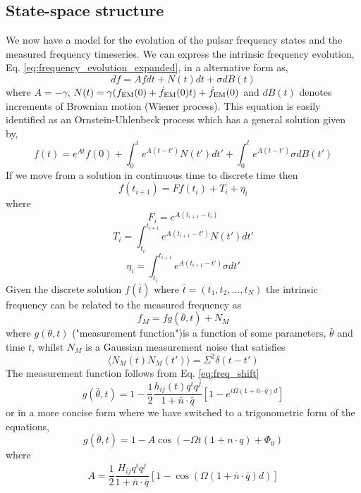 \documentclass[fleqn,usenatbib,useAMS]{mnras}
\begin{document}
\subsection{State-space structure} \label{sec3}
We now have a model for the evolution of the pulsar frequency states and the measured frequency timeseries. We can express the intrinsic frequency evolution, Eq. \ref{eq:frequency_evolution_expanded}, in a alternative form as,
\begin{equation}
	df = A f dt + N(t) dt + \sigma dB(t)
	\label{eq:state1}
\end{equation}
where $A = -\gamma$, $N(t) = \gamma(f_{\rm EM}(0) + \dot{f}_{\rm EM}(0) t) +\dot{f}_{\rm EM}(0)$ and $dB(t)$ denotes increments of Brownian motion (Wiener process). This equation is easily identified as an Ornstein-Uhlenbeck process which has a general solution given by,
\begin{equation}
	f(t) = e^{At}f(0) + \int_0^t e^{A(t-t')} N(t') dt' + \int_0^t e^{A(t-t')} \sigma dB(t')
\end{equation} 
If we move from a solution in continuous time to discrete time then
\begin{equation}
	f(t_{i+1}) = F f(t_i) + T_i + \eta_i
\end{equation}
where
\begin{equation}
	F_i = e^{A (t_{i+1} - t_i)}
\end{equation}
\begin{equation}
	T_i = \int_{t_i}^{t_{i+1}}  e^{A (t_{i+1} - t')} N(t') dt'
\end{equation}
\begin{equation}
	\eta_i = \int_{t_i}^{t_{i+1}}  e^{A (t_{i+1} - t')} \sigma dt'
\end{equation}
Given the discrete solution $f(\bar{t})$ where $\bar{t} = (t_1, t_2, ...,t_N)$ the intrinsic frequency can be related to the measured frequency as 
\begin{equation}
	f_M = f g(\bar{\theta},t) + N_M
\end{equation}
where $g(\theta,t)$ ("measurement function")is a function of some parameters, $\bar{\theta}$ and time $t$, whilst $N_M$ is a Gaussian measurement noise that satisfies 
\begin{equation}
	\langle N_M(t) N_M(t') \rangle = \Sigma^2 \delta(t - t')
\end{equation}
The measurement function follows from Eq. \ref{eq:freq_shift}
\begin{equation} \label{eq:final}
	g(\bar{\theta},t) = 1 - \frac{1}{2} \frac{h_{ij}(t) q^i q^j}{1 + \bar{n} \cdot \bar{q}}[1 - e^{i \Omega(1+\bar{n} \cdot \bar{q}) d}]
\end{equation}
or in a more concise form where we have switched to a trigonometric form of the equations,
\begin{equation} 
	g(\bar{\theta},t) = 1 -A \cos(-\Omega t (1 + n\cdot q ) + \Phi_0)
\end{equation}
where 
\begin{equation}
	A =  \frac{1}{2} \frac{H_{ij} q^i q^j}{1 + \bar{n} \cdot \bar{q}}[1 - \cos\left( {\Omega(1+\bar{n} \cdot \bar{q}) d}\right)]
		\label{eq:state2}
\end{equation}
\end{document}
